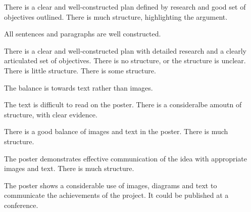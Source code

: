 \documentclass{../../fal_assignment}
\begin{document}
\begin{markingrubric}
	\par 		There is a clear and well-constructed plan defined by research and good set of objectives outlined.
	\grade 		There is much structure, highlighting the argument.
	\par 		All sentences and paragraphs are well constructed.
	\par 		There is a clear and well-constructed plan with detailed research and a clearly articulated set of objectives.
	\grade\fail 	There is no structure, or the structure is unclear.
	\grade 		There is little structure.
	\grade 		There is some structure.
	\par 		The balance is towards text rather than images.
	\par		The text is difficult to read on the poster.
	\grade 		There is a consideralbe amoutn of structure, with clear evidence.
	\par 		There is a good balance of images and text in the poster.
	\grade 		There is much structure.
	\par 		The poster demonstrates effective communication of the idea with appropriate images and text.
	\grade 		There is much structure.
	\par 		The poster shows a considerable use of images, diagrams and text to communicate the achievements of the project. It could be published at a conference.
\end{markingrubric}
\end{document}
